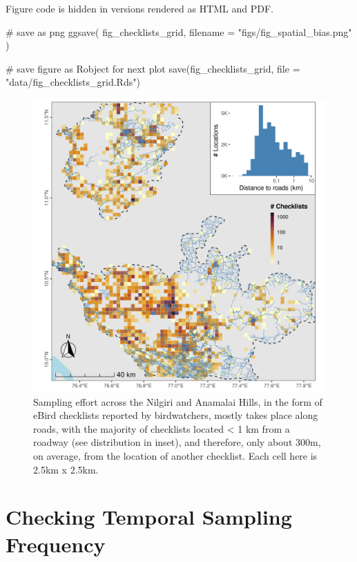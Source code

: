 \documentclass[
]{article}
\newenvironment{Shaded}{}{}
\newcommand{\CommentTok}[1]{\textcolor[rgb]{0.00,0.50,0.00}{#1}}
\newcommand{\DataTypeTok}[1]{#1}
\newcommand{\KeywordTok}[1]{\textcolor[rgb]{0.00,0.00,1.00}{#1}}
\newcommand{\NormalTok}[1]{#1}
\newcommand{\StringTok}[1]{\textcolor[rgb]{0.00,0.50,0.50}{#1}}
\begin{document}
Figure code is hidden in versions rendered as HTML and PDF.

\begin{Shaded}
\begin{Highlighting}[]
\CommentTok{# save as png}
\KeywordTok{ggsave}\NormalTok{(}
\NormalTok{  fig_checklists_grid,}
  \DataTypeTok{filename =} \StringTok{"figs/fig_spatial_bias.png"}
\NormalTok{)}

\CommentTok{# save figure as Robject for next plot}
\KeywordTok{save}\NormalTok{(fig_checklists_grid, }\DataTypeTok{file =} \StringTok{"data/fig_checklists_grid.Rds"}\NormalTok{)}
\end{Highlighting}
\end{Shaded}

\begin{figure}
\centering
\includegraphics{figs/fig_spatial_bias.png}
\caption{Sampling effort across the Nilgiri and Anamalai Hills, in the form of eBird checklists reported by birdwatchers, mostly takes place along roads, with the majority of checklists located \textless{} 1 km from a roadway (see distribution in inset), and therefore, only about 300m, on average, from the location of another checklist. Each cell here is 2.5km x 2.5km.}
\end{figure}

\hypertarget{checking-temporal-sampling-frequency}{%
\section{Checking Temporal Sampling Frequency}\label{checking-temporal-sampling-frequency}}
\end{document}
